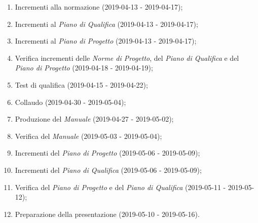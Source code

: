 	\begin{enumerate}[label= 5.\arabic*)]
		\item Incrementi alla normazione (2019-04-13 - 2019-04-17);
		\item Incrementi al \textit{Piano di Qualifica} (2019-04-13 - 2019-04-17);
		\item Incrementi al \textit{Piano di Progetto} (2019-04-13 - 2019-04-17);
		\item Verifica incrementi delle \textit{Norme di Progetto}, del \textit{Piano di Qualifica} e del \textit{Piano di Progetto} (2019-04-18 - 2019-04-19);
		\item Test di qualifica (2019-04-15 - 2019-04-22);
		\item Collaudo (2019-04-30 - 2019-05-04);
		\item Produzione del \textit{Manuale} (2019-04-27 - 2019-05-02);
		\item Verifica del \textit{Manuale} (2019-05-03 - 2019-05-04);
		\item Incrementi del \textit{Piano di Progetto} (2019-05-06 - 2019-05-09);
		\item Incrementi del \textit{Piano di Qualifica} (2019-05-06 - 2019-05-09);
		\item Verifica del \textit{Piano di Progetto} e del \textit{Piano di Qualifica} (2019-05-11 - 2019-05-12);
		\item Preparazione della presentazione (2019-05-10 - 2019-05-16).
	\end{enumerate}


